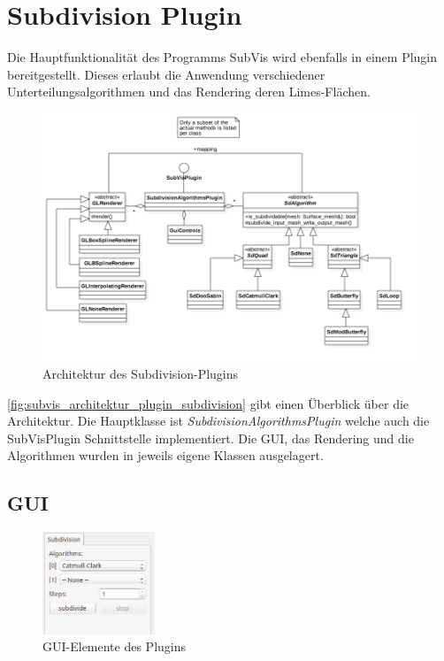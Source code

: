 \chapter{Subdivision Plugin}

Die Hauptfunktionalität des Programms SubVis wird ebenfalls in einem Plugin bereitgestellt. 
Dieses erlaubt die Anwendung verschiedener Unterteilungsalgorithmen und das Rendering deren Limes-Flächen.

\begin{figure}
  \centering
  \includegraphics[width=\textwidth]{content/media/subvis_architektur_plugin_subdivision.png}
  \caption{Architektur des Subdivision-Plugins}
  \label{fig:subvis_architektur_plugin_subdivision}
\end{figure}

\autoref{fig:subvis_architektur_plugin_subdivision} gibt einen Überblick über die Architektur.
Die Hauptklasse ist \emph{SubdivisionAlgorithmsPlugin} welche auch die SubVisPlugin  Schnittstelle implementiert.
Die GUI, das Rendering und die Algorithmen wurden in jeweils eigene Klassen ausgelagert.

\section{GUI}

\begin{figure}
  \centering
  \includegraphics[width=0.3\textwidth]{content/media/subvis_plugin.png}
  \caption{GUI-Elemente des Plugins}
  \label{fig:subivs_plugin_gui}
\end{figure}

